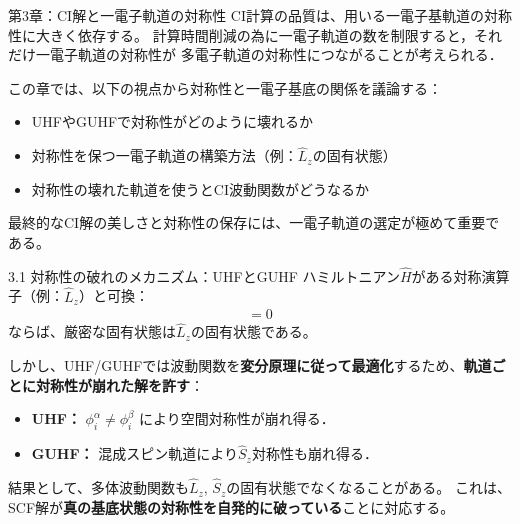 \documentclass{beamer}
\begin{document}
\begin{frame}{第3章：CI解と一電子軌道の対称性}
  CI計算の品質は、用いる一電子基軌道の対称性に大きく依存する。
  計算時間削減の為に一電子軌道の数を制限すると，それだけ一電子軌道の対称性が
  多電子軌道の対称性につながることが考えられる．

  \vspace{1em}
  この章では、以下の視点から対称性と一電子基底の関係を議論する：
  \begin{itemize}
    \item UHFやGUHFで対称性がどのように壊れるか
    \item 対称性を保つ一電子軌道の構築方法（例：$\hat{L}_z$の固有状態）
    \item 対称性の壊れた軌道を使うとCI波動関数がどうなるか
  \end{itemize}
  
  \vspace{1em}
  最終的なCI解の美しさと対称性の保存には、一電子軌道の選定が極めて重要である。
  \end{frame}
  


  \begin{frame}{3.1 対称性の破れのメカニズム：UHFとGUHF}
    ハミルトニアン$\hat{H}$がある対称演算子（例：$\hat{L}_z$）と可換：
    \begin{align*}
    [\hat{H}, \hat{L}_z] = 0
    \end{align*}
    ならば、厳密な固有状態は$\hat{L}_z$の固有状態である。
    
    \vspace{1em}
    しかし、UHF/GUHFでは波動関数を\textbf{変分原理に従って最適化}するため、\textbf{軌道ごとに対称性が崩れた解を許す}：
    \begin{itemize}
      \item \textbf{UHF：} $\phi_i^{\alpha} \neq \phi_i^{\beta}$ により空間対称性が崩れ得る．
      \item \textbf{GUHF：} 混成スピン軌道により$\hat{S}_z$対称性も崩れ得る．
    \end{itemize}
    
    \vspace{1em}
    結果として、多体波動関数も$\hat{L}_z$, $\hat{S}_z$の固有状態でなくなることがある。
    これは、SCF解が\textbf{真の基底状態の対称性を自発的に破っている}ことに対応する。
    \end{frame}
  
\end{document}
